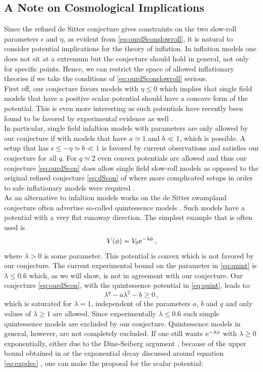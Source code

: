 \documentclass[12pt]{report}
\newcommand{\be}{\begin{equation}}
\newcommand{\ee}{\end{equation}}
\def\rme{{\rm e}}
\begin{document}
\subsection{A Note on Cosmological Implications}
Since the refined de Sitter conjecture gives constraints on the two slow-roll parameters $\epsilon$ and $\eta$, as evident from \eqref{eq:ourdSconslowroll}, it is natural to consider potential implications for the theory of inflation. In inflation models one does not sit at a extremum but the conjecture should hold in general, not only for specific points. Hence, we can restrict the space of allowed inflationary theories if we take the conditions of \eqref{eq:ourdSconslowroll} serious.\\
First off, our conjecture favors models with $\eta \leq 0$ which implies that single field models that have a positive scalar potential should have a concave form of the potential. This is even more interesting as such potentials have recently been found to be favored by experimental evidence as well \cite{Planck:2018jri}.\\
In particular, single field infaltion models with parameters are only allowed by our conjecture if with models that have $a \simeq 1$ and $b \ll 1$, which is possible.  A setup that has $\epsilon \leq - \eta \simeq b \ll 1 $ is favored by current observations \cite{Planck:2018jri} and satisfies our conjecture for all $q$. For $q\simeq 2$ even convex potentials are allowed and thus our conjecture \eqref{eq:ourdScon} does allow single field slow-roll models as opposed to the original refined conjecture \eqref{eq:dScon} of \cite{Ooguri:2018wrx} where more complicated setups in order to safe inflationary models were required \cite{Achucarro:2018vey,Kehagias:2018uem}.\\
As an alternative to infaltion models works on the de Sitter swampland conjecture often advertise so-called quintessence models \cite{Agrawal:2018own}. Such models have a potential with a very flat runaway direction. The simplest example that is often used is
\be 
V(\phi) = V_0 \rme^ {-\lambda \phi}\,,
\label{eq:quint}
\ee
where $\lambda >0$ is some parameter. This potential is convex which is not favored by our conjecture. The current experimental bound on the parameter in \eqref{eq:quint} is $\lambda \leq 0.6$ \cite{Agrawal:2018own} which, as we will show, is not in agreement with our conjecture. Our conjecture \eqref{eq:ourdScon}, with the quintessence potential in \eqref{eq:quint}, leads to:
\be 
\lambda^ q - a \lambda^ 2 - b \geq 0\,,
\ee
which is saturated for $\lambda = 1$, independent of the parameters $a$, $b$ and $q$ and only values of $\lambda \geq 1$ are allowed. Since experimentally $\lambda \leq 0.6$ such simple quintessence models are excluded by our conjecture. Quintessence models in general, however, are not completely excluded. If one still wants $\rme^ {-\lambda \phi}$ with $\lambda \geq 0$ exponentially, either due to the Dine-Seiberg argument \cite{Dine:1985he}, because of the upper bound obtained in \cite{Hebecker:2018vxz} or the exponential decay discussed around equation \eqref{eq:expdec} \cite{Ooguri:2018wrx}, one can make the proposal for the scalar potential:
\end{document}

